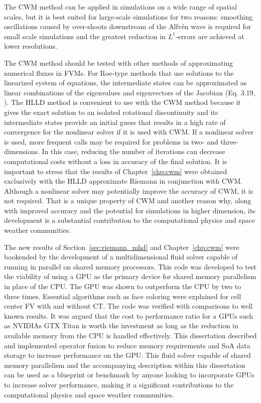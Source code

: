 The CWM method can be applied in simulations on a wide range of spatial scales, but it is best suited for large-scale simulations for two reasons: smoothing oscillations caused by over-shoots downstream of the Alfv{\'e}n wave is required for small scale simulations and the greatest reduction in $L^1$-errors are achieved at lower resolutions.    
  
The CWM method should be tested with other methods of approximating numerical fluxes in FVMs.  For Roe-type methods that use solutions to the linearized system of equations, the intermediate states can be approximated as linear combinations of the eigenvalues and eigenvectors of the Jacobian (Eq. 3.19, \citep{Ryu:1995a}).  The HLLD method is convenient to use with the CWM method because it gives the exact solution to an isolated rotational discontinuity \citep{Miyoshi:2005} and its intermediate states provide an initial guess that results in a high rate of convergence for the nonlinear solver if it is used with CWM.  If a nonlinear solver is used, more frequent calls may be required for problems in two- and three- dimensions.  In this case, reducing the number of iterations can decrease computational costs without a loss in accuracy of the final solution.  It is important to stress that the results of Chapter~\ref{chp:cwm} were obtained exclusively with the HLLD approximate Riemann in conjunction with CWM.  Although a nonlinear solver may potentially improve the accuracy of CWM, it is not required.  That is a unique property of CWM and another reason why, along with improved accuracy and the potential for simulations in higher dimension, its development is a substantial contribution to the computational physics and space weather communities.
 
The new results of Section~\ref{sec:riemann_mhd} and Chapter~\ref{chp:cwm} were bookended by the development of a multidimensional fluid solver capable of running in parallel on shared memory processors.  This code was developed to test the viability of using a GPU as the primary device for shared memory parallelism in place of the CPU.  The GPU was shown to outperform the CPU by two to three times.  Essential algorithms such as face coloring were explained for cell center FV with and without CT.  The code was verified with comparisons to well known results.  It was argued that the cost to performance ratio for a GPUs such as NVIDIAs GTX Titan is worth the investment as long as the reduction in available memory from the CPU is handled effectively.  This dissertation described and implemented operator fusion to reduce memory requirements and SoA data storage to increase performance on the GPU.  This fluid solver capable of shared memory parallelism and the accompanying description within this dissertation can be used as a blueprint or benchmark by anyone looking to incorporate GPUs to increase solver performance, making it a significant contributions to the computational physics and space weather communities. 

